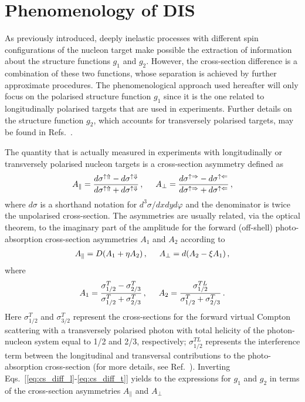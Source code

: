 \section{Phenomenology of DIS}
As previously introduced, deeply inelastic processes with different spin configurations of the nucleon target make possible the extraction of information about the structure functions $g_1$ and $g_2$. However, the cross-section difference is a combination of these two functions, whose separation is achieved by further approximate procedures. The phenomenological approach used hereafter will only focus on the polarised structure function $g_1$ since it is the one related to longitudinally polarised targets that are used in experiments. Further details on the structure function $g_2$, which accounts for transversely polarised targets, may be found in Refs.~\cite{Anselmino:1994gn, leader_2001, leader_predazzi_1996}.\par
The quantity that is actually measured in experiments with longitudinally or transversely polarised nucleon targets is a cross-section asymmetry defined as
\begin{equation}
  A_{\parallel} = \frac{d\sigma^{\uparrow \Uparrow} - d\sigma^{\uparrow \Downarrow}}{d\sigma^{\uparrow \Uparrow} + d\sigma^{\uparrow \Downarrow}} \,, \hspace{5mm}  A_{\perp} = \frac{d\sigma^{\uparrow \Rightarrow} - d\sigma^{\uparrow \Leftarrow}}{d\sigma^{\uparrow \Rightarrow} + d\sigma^{\uparrow \Leftarrow}} \,,
  \label{eq:asymmetry}
\end{equation}
where $d\sigma$ is a shorthand notation for $d^3\sigma/dxdyd\varphi$ and the denominator is twice the unpolarised cross-section. The asymmetries are usually related, via the optical theorem, to the imaginary part of the amplitude for the forward (off-shell) photo-absorption cross-section asymmetries $A_1$ and $A_2$ according to
\begin{align}
  A_{\parallel} = D(A_1 + \eta A_2)\,, \hspace{5mm} A_{\perp} = d(A_2 - \xi A_1)\,,
\end{align}
where 
\begin{equation}
  A_1 = \frac{\sigma_{1/2}^T - \sigma_{2/3}^T}{\sigma_{1/2}^T + \sigma_{2/3}^T} \,, \hspace{5mm} A_2 = \frac{\sigma_{1/2}^{TL}}{\sigma_{1/2}^T + \sigma_{2/3}^T}\,.
\end{equation}
Here $\sigma_{1/2}^T$ and $\sigma_{3/2}^T$ represent the cross-sections for the forward virtual Compton scattering with a transversely polarised photon with total helicity of the photon-nucleon system equal to 1/2 and 2/3, respectively; $\sigma_{1/2}^{TL}$ represents the interference term between the longitudinal and transversal contributions to the photo-absorption cross-section (for more details, see Ref.~\cite{leader_predazzi_1996}). Inverting Eqs.~[\ref{eq:cs_diff_l}-\ref{eq:cs_diff_t}] yields to the expressions for $g_1$ and $g_2$ in terms of the cross-section asymmetries $A_{\parallel}$ and $A_{\perp}$
